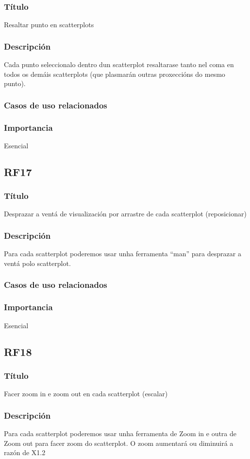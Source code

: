 \subsubsection{Título}
Resaltar punto en scatterplots
\subsubsection{Descripción}
Cada punto seleccionalo dentro dun scatterplot resaltarase tanto nel coma en todos os demáis scatterplots (que plasmarán outras proxeccións do mesmo punto).
\subsubsection{Casos de uso relacionados}
\subsubsection{Importancia}
Esencial

\subsection{RF17}
\subsubsection{Título}
Desprazar a ventá de visualización por arrastre de cada scatterplot (reposicionar)
\subsubsection{Descripción}
Para cada scatterplot poderemos usar unha ferramenta ``man'' para desprazar a ventá polo scatterplot.
\subsubsection{Casos de uso relacionados}
\subsubsection{Importancia}
Esencial

\subsection{RF18}
\subsubsection{Título}
Facer zoom in e zoom out en cada scatterplot (escalar)
\subsubsection{Descripción}
Para cada scatterplot poderemos usar unha ferramenta de Zoom in e outra de Zoom out para facer zoom do scatterplot. O zoom aumentará ou diminuirá a razón de X1.2
